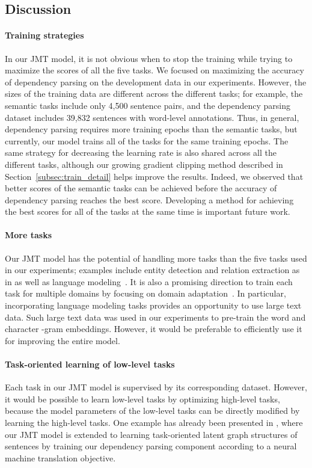 \documentclass[11pt,a4paper]{article}
\begin{document}
\subsection{Discussion}

\paragraph{Training strategies}
In our JMT model, it is not obvious when to stop the training while trying to maximize the scores of all the five tasks.
We focused on maximizing the accuracy of dependency parsing on the development data in our experiments.
However, the sizes of the training data are different across the different tasks; for example, the semantic tasks include only 4,500 sentence pairs, and the dependency parsing dataset includes 39,832 sentences with word-level annotations.
Thus, in general, dependency parsing requires more training epochs than the semantic tasks, but currently, our model trains all of the tasks for the same training epochs.
The same strategy for decreasing the learning rate is also shared across all the different tasks, although our growing gradient clipping method described in Section~\ref{subsec:train_detail} helps improve the results.
Indeed, we observed that better scores of the semantic tasks can be achieved before the accuracy of dependency parsing reaches the best score.
Developing a method for achieving the best scores for all of the tasks at the same time is important future work.

\paragraph{More tasks}
Our JMT model has the potential of handling more tasks than the five tasks used in our experiments; examples include entity detection and relation extraction as in \citet{miwa2016rel} as well as language modeling~\citep{godwin2016multi}.
It is also a promising direction to train each task for multiple domains by focusing on domain adaptation~\citep{sogaard2016}.
In particular, incorporating language modeling tasks provides an opportunity to use large text data.
Such large text data was used in our experiments to pre-train the word and character -gram embeddings. However, it would be preferable to efficiently use it for improving the entire model.

\paragraph{Task-oriented learning of low-level tasks}
Each task in our JMT model is supervised by its corresponding dataset.
However, it would be possible to learn low-level tasks by optimizing high-level tasks, because the model parameters of the low-level tasks can be directly modified by learning the high-level tasks.
One example has already been presented in \citet{hashimoto2017lgp}, where our JMT model is extended to learning task-oriented latent graph structures of sentences by training our dependency parsing component according to a neural machine translation objective.
\end{document}
